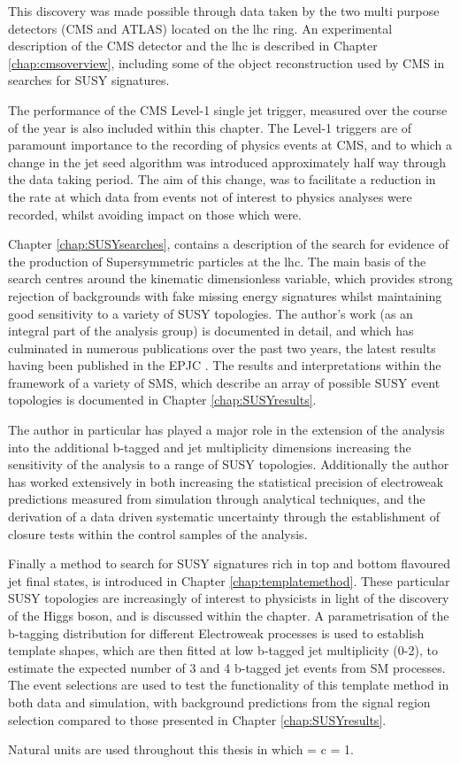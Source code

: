 This discovery was made possible through data taken by the two multi purpose detectors (\acf{CMS} and \ac{ATLAS}) located on the \ac{lhc} ring. An experimental description of the \ac{CMS} detector and the \ac{lhc} is described in Chapter \ref{chap:cmsoverview}, including some of the object reconstruction used by \ac{CMS} in searches for \ac{SUSY} signatures. 

The performance of the \ac{CMS} Level-1 single jet trigger, measured over the course of the year is also included within this chapter. The Level-1 triggers are of paramount importance to the recording of physics events at \ac{CMS}, and to which a change in the jet seed algorithm was introduced approximately half way through the data taking period. The aim of this change, was to facilitate a reduction in the rate at which data from events not of interest to physics analyses were recorded, whilst avoiding impact on those which were.

Chapter \ref{chap:SUSYsearches}, contains a description of the search for evidence of the production of Supersymmetric particles at the \ac{lhc}. The main basis of the search centres around the kinematic dimensionless \alphat variable, which provides strong rejection of backgrounds with fake missing energy signatures whilst maintaining good sensitivity to a variety of \ac{SUSY} topologies. The author's work (as an integral part of the analysis group) is documented in detail, and which has culminated in numerous publications over the past two years, the latest results having been published in the \acf{EPJC} \cite{ra1_epjc}.  The results and interpretations within the framework of a variety of \acf{SMS}, which describe an array of possible \ac{SUSY} event topologies is documented in Chapter \ref{chap:SUSYresults}. 

The author in particular has played a major role in the extension of the \alphat analysis into the additional b-tagged and jet multiplicity dimensions increasing the sensitivity of the analysis to a range of \ac{SUSY} topologies. Additionally the author has worked extensively in both increasing the statistical precision of electroweak predictions measured from simulation through analytical techniques, and the derivation of a data driven systematic uncertainty through the establishment of closure tests within the control samples of the analysis. 

Finally a method to search for \ac{SUSY} signatures rich in top and bottom flavoured jet final states, is introduced in Chapter \ref{chap:templatemethod}. These particular \ac{SUSY} topologies are increasingly of interest to physicists in light of the discovery of the Higgs boson, and is discussed within the chapter. A parametrisation of the b-tagging distribution for different Electroweak processes is used to establish template shapes, which are then fitted at low b-tagged jet multiplicity (0-2),  to estimate the expected number of 3 and 4 b-tagged jet events from \ac{SM} processes. The \alphat event selections are used to test the functionality of this template method in both data and simulation, with background predictions from the signal region selection compared to those presented in Chapter \ref{chap:SUSYresults}. 


Natural units are used throughout this thesis in which \hbarred = c = 1.
